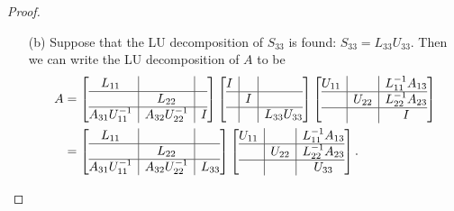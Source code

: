 \documentclass[12pt]{report}
\begin{document}
\begin{problem}
\begin{proof}
\begin{enumerate}
  \item [(b)] Suppose that the LU decomposition of $S_{33}$ is found: $S_{33} = L_{33}U_{33}$. Then we can write the LU decomposition of $A$ to be
  \begin{align*}
    A &= \left[
      \begin{array}{@{}c|c|c@{}}
      L_{11} &&\\\hline
      &L_{22}&\\\hline
      A_{31}U_{11}^{-1} &A_{32}U_{22}^{-1} &I\\
    \end{array}
    \right]\left[
      \begin{array}{@{}c|c|c@{}}
      I &&\\\hline
      &I&\\\hline
      &&L_{33}U_{33}\\
    \end{array}
    \right]\left[
      \begin{array}{@{}c|c|c@{}}
      U_{11} &&L_{11}^{-1}A_{13}\\\hline
      &U_{22}&L_{22}^{-1}A_{23}\\\hline
      &&I\\
    \end{array}
    \right]\\
    &= \left[
      \begin{array}{@{}c|c|c@{}}
      L_{11} &&\\\hline
      &L_{22}&\\\hline
      A_{31}U_{11}^{-1} &A_{32}U_{22}^{-1} &L_{33}\\
    \end{array}
    \right]\left[
      \begin{array}{@{}c|c|c@{}}
      U_{11} &&L_{11}^{-1}A_{13}\\\hline
      &U_{22}&L_{22}^{-1}A_{23}\\\hline
      &&U_{33}\\
    \end{array}
    \right].
  \end{align*}

  



\end{enumerate}

\end{proof}
\end{problem}




\end{document}
